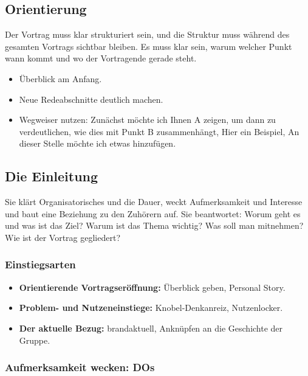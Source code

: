 \documentclass[12pt, a4paper]{article}
\begin{document}
\subsection{Orientierung}

Der Vortrag muss klar strukturiert sein, und die Struktur muss während des
gesamten Vortrags sichtbar bleiben. Es muss klar sein, warum welcher Punkt
wann kommt und wo der Vortragende gerade steht.

\begin{itemize}
  \item Überblick am Anfang.
  \item Neue Redeabschnitte deutlich machen.
  \item Wegweiser nutzen: \glqq Zunächst möchte ich Ihnen A zeigen, um dann
        zu verdeutlichen, wie dies mit Punkt B zusammenhängt\grqq{},
        \glqq Hier ein Beispiel\grqq{}, \glqq An dieser Stelle möchte ich
        etwas hinzufügen.\grqq{}
\end{itemize}

\subsection{Die Einleitung}

Sie klärt Organisatorisches und die Dauer, weckt Aufmerksamkeit und Interesse
und baut eine Beziehung zu den Zuhörern auf. Sie beantwortet: Worum geht es
und was ist das Ziel? Warum ist das Thema wichtig? Was soll man mitnehmen?
Wie ist der Vortrag gegliedert?

\subsubsection{Einstiegsarten}

\begin{itemize}
  \item \textbf{Orientierende Vortragseröffnung:} Überblick geben, Personal
        Story.
  \item \textbf{Problem- und Nutzeneinstiege:} Knobel-Denkanreiz,
        \glqq Nutzenlocker\grqq{}.
  \item \textbf{Der aktuelle Bezug:} brandaktuell, Anknüpfen an die
        Geschichte der Gruppe.
\end{itemize}

\subsubsection{Aufmerksamkeit wecken: DOs}
\end{document}

